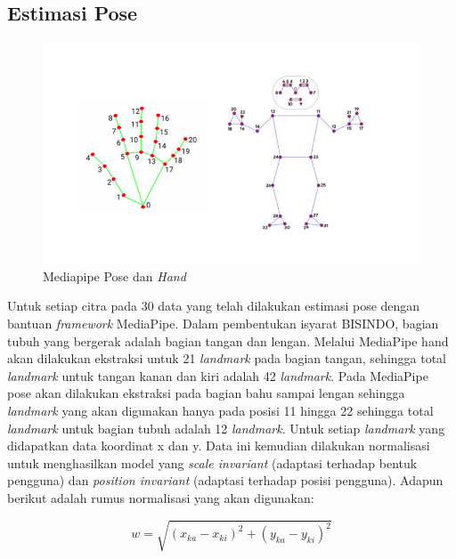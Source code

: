 \subsection{Estimasi Pose}
\label{subsec:estimasipose}

\begin{figure}[ht]
  \centering

  \includegraphics[scale=0.3]{gambar/bab3-pose-combine.png}

  \caption{Mediapipe Pose dan \emph{Hand}}
  \label{fig:estimasipose}
\end{figure}

Untuk setiap citra pada 30 data yang telah dilakukan estimasi pose dengan bantuan \textit{framework} MediaPipe. Dalam pembentukan isyarat BISINDO, bagian tubuh yang bergerak adalah bagian tangan dan lengan. Melalui MediaPipe hand akan dilakukan ekstraksi untuk 21 \textit{landmark} pada bagian tangan, sehingga total \textit{landmark} untuk tangan kanan dan kiri adalah 42 \textit{landmark}. Pada MediaPipe pose akan dilakukan ekstraksi pada bagian bahu sampai lengan sehingga \textit{landmark} yang akan digunakan hanya pada posisi 11 hingga 22 sehingga total \textit{landmark} untuk bagian tubuh adalah 12 \textit{landmark}. Untuk setiap \textit{landmark} yang didapatkan data koordinat x dan y. Data ini kemudian dilakukan normalisasi untuk menghasilkan model yang \textit{scale invariant} (adaptasi terhadap bentuk pengguna) dan \textit{position invariant} (adaptasi terhadap posisi pengguna). Adapun berikut adalah rumus normalisasi yang akan digunakan:

\begin{equation}
  \label{eq:shouderWidthNorm}
  w = \sqrt{(x_{ka} - x_{ki})^2 + (y_{ka} - y_{ki})^2}
\end{equation}

